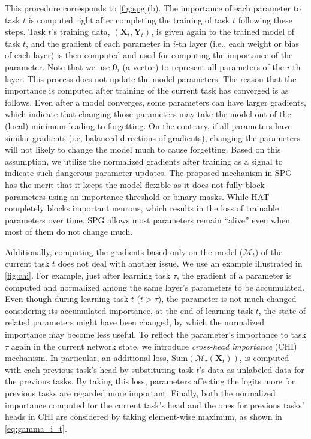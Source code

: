 This procedure corresponds to \cref{fig:spg}(b).
The importance of each parameter to task $t$ is computed right after completing the training of task $t$ following these steps.
Task $t$'s training data, $(\bm{X}_t, \bm{Y}_t)$, is given again to the trained model of task $t$, and the gradient of each parameter in $i$-th layer (i.e., each weight or bias of each layer) is then computed and used for computing the importance of the parameter. Note that we use $\bm{\theta}_i$ (a vector) to represent all parameters of the $i$-th layer. This process does not update the model parameters. 
The reason that the importance is computed after training of the current task has converged is as follows. Even after a model converges, some parameters can have larger gradients, which indicate that changing those parameters may take the model out of the (local) minimum leading to forgetting. On the contrary, if all parameters have similar gradients (i.e, balanced directions of gradients), changing the parameters will not likely to change the model much to cause forgetting.
Based on this assumption, we utilize the normalized gradients after training as a signal to indicate such dangerous parameter updates.
The proposed mechanism in SPG has the merit that it keeps the model flexible as it does not fully block parameters using an importance threshold or binary masks.
While HAT completely blocks important neurons, which results in the loss of trainable parameters over time, SPG allows most parameters remain ``alive'' even when most of them do not change much.






Additionally, computing the gradients based only on the model ($\mathcal{M}_t$) of the current task $t$ does not deal with another issue. 
We use an example illustrated in \cref{fig:chi}.
For example, just after learning task $\tau$, the gradient of a parameter is computed and normalized among the same layer's parameters to be accumulated.
Even though during learning task $t$ ($t > \tau$), the parameter is not much changed considering its accumulated importance, at the end of learning task $t$, the state of related parameters might have been changed, by which the normalized importance may become less useful. To reflect the parameter's importance to task $\tau$ again in the current network state, we introduce \textit{cross-head importance} (CHI) mechanism. In particular, an additional loss, $\mathrm{Sum}(\mathcal{M}_\tau(\bm{X}_t))$, is computed with each previous task's head by substituting task $t$'s data as unlabeled data for the previous tasks. By taking this loss, parameters affecting the logits more  for previous tasks are regarded more important.
Finally, both the normalized importance computed for the current task's head and the ones for previous tasks' heads in CHI are considered by taking element-wise maximum, as shown in \cref{eq:gamma_i_t}.

